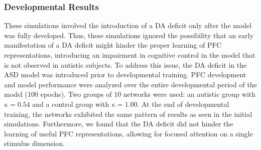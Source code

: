 \subsubsection{Developmental Results}
These simulations involved the introduction of a DA deficit only after the model was fully developed. Thus, these simulations ignored the possibility that an early manifestation of a DA deficit might hinder the proper learning of PFC representations, introducing an impairment in cognitive control in the model that is not observed in autistic subjects. To address this issue, the DA deficit in the ASD model was introduced prior to developmental training. PFC development and model performance were analyzed over the entire developmental period of the model ($100$ epochs). Two groups of $10$ networks were used: an autistic group with $\kappa = 0.54$ and a control group with $\kappa = 1.00$. At the end of developmental training, the networks exhibited the same pattern of results as seen in the initial simulations. Furthermore, we found that the DA deficit did not hinder the learning of useful PFC representations, allowing for focused attention on a single stimulus dimension.




